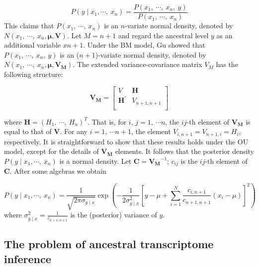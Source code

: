 \documentclass[]{book}
\begin{document}
\[P\left(y\mid x_1,\cdots,\  x_n\right)=\frac{P\left(x_1,\  \cdots,\  x_n,\  y\right)}{P\left(x_1,\  \cdots,\  x_n\right)}\tag{4.5}\]
This claims that \(P\left(x_1,\  \cdots,\  x_n\right)\) is an \(n\)-variate normal density, denoted by \(N\left(x_1,\  \cdots,\  x_n, \boldsymbol{\mu},\boldsymbol{V}\right)\). Let \(M=n+1\) and regard the ancestral level \(y\) as an additional variable \(x{n+1}\). Under the BM model, Gu\citep{gu2004} showed that \(P\left(x_1,\  \cdots,\  x_n,\  y\right)\) is an (\(n+1\))-variate normal density, denoted by \(N\left(x_1,\  \cdots,\  x_n, \boldsymbol{\mu},\boldsymbol{V_{M}}\right)\). The extended variance-covariance matrix \(V_{M}\) has the following structure:

\[
\boldsymbol{V_M}=
 \left[
 \begin{matrix}
   V & \boldsymbol{H}\\
   \boldsymbol{H^{'}} & V_{n+1,n+1} \\
  \end{matrix}
  \right] \tag{4.6}
\]

where \(\boldsymbol{H}=\left(H_1,\  \cdots,\  H_n\right)^T\). That is, for \(i\), \(j=1,\  \cdots n\), the \(ij\)-th element of \(\boldsymbol{V_M}\) is equal to that of \(\boldsymbol{V}\). For any \(i=1,\  \cdots n+1\), the element \(V_{i,n+1}=V_{n+1,i}=H_i\), respectively. It is straightforward to show that these results holds under the OU model, except for the details of \(\boldsymbol{V_M}\) elements. It follows that the posterior density \(P\left(y\mid x_1,\cdots,\  x_n\right)\) is a normal density. Let \(\boldsymbol{C}=\boldsymbol{V_M}^{-1}\); \(c_{ij}\) is the \(ij\)-th element of \(\boldsymbol{C}\). After some algebras we obtain

\[P\left(y\mid x_1,\cdots,\  x_n\right)=\frac{1}{\sqrt{2\pi\sigma_{y\mid x}}}\exp\left(-\frac{1}{2\sigma_{y\mid x}^2}\left[y-\mu+\sum_{i=1}^N\frac{c_{i,n+1}}{c_{n+1,n+1}}\left(x_i-\mu\right)\right]^2\right)\tag{4.7}\]
where \(\sigma_{y\mid x}^2=\frac{1}{c_{n+1,n+1}}\) is the (posterior) variance of \(y\).

\hypertarget{the-problem-of-ancestral-transcriptome-inference}{%
\subsection{The problem of ancestral transcriptome inference}\label{the-problem-of-ancestral-transcriptome-inference}}
\end{document}
